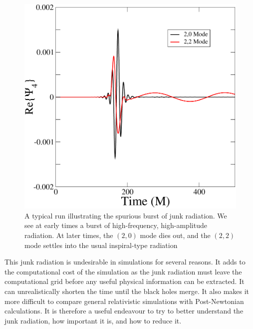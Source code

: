 \begin{figure}
 \includegraphics[scale=0.95]{chap5/Typical}
  \caption{A typical run illustrating the spurious burst of junk radiation. We see at early times a burst of high-frequency, high-amplitude radiation. At later times, the $(2,0)$ mode dies out, and the $(2,2)$ mode settles into the usual inspiral-type radiation}
  \label{fig:Typical}
\end{figure}


This junk radiation is undesirable in simulations for several
reasons. It adds to the computational cost of the simulation as the
junk radiation must leave the computational grid before any useful
physical information can be extracted.  It can unrealistically shorten
the time until the black holes
merge\cite{BodeEtAl:2008}. It also makes it more difficult
to compare general relativistic simulations with Post-Newtonian
calculations. It is therefore a useful endeavour to try to better
understand the junk radiation, how important it is, and how to reduce
it.

